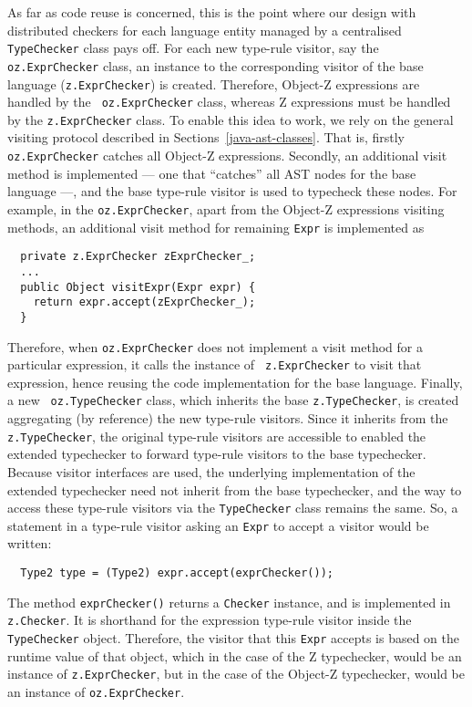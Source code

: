 \documentclass{llncs}
\begin{document}
As far as code reuse is concerned, this is the point where our design
with distributed checkers for each language entity managed by a
centralised {\tt TypeChecker} class pays off.  For each new type-rule
visitor, say the {\tt oz.ExprChecker} class, an instance to the
corresponding visitor of the base language ({\tt z.ExprChecker}) is
created. Therefore, Object-Z expressions are handled by the {\tt
oz.ExprChecker} class, whereas Z expressions must be handled by the
{\tt z.ExprChecker} class.  To enable this idea to work, we rely on
the general visiting protocol described in
Sections~\ref{java-ast-classes}.  That
is, firstly {\tt oz.ExprChecker} catches all Object-Z expressions.
Secondly, an additional visit method is implemented --- one that
``catches'' all AST nodes for the base language ---, and the base
type-rule visitor is used to typecheck these nodes.  For example, in
the {\tt oz.ExprChecker}, apart from the Object-Z expressions
visiting methods, an additional visit method for remaining {\tt Expr}
is implemented as
%
\begin{verbatim}
  private z.ExprChecker zExprChecker_;
  ...
  public Object visitExpr(Expr expr) {
    return expr.accept(zExprChecker_);
  }
\end{verbatim}
%
Therefore, when {\tt oz.ExprChecker} does not implement a visit method
for a particular expression, it calls the instance of {\tt
z.ExprChecker} to visit that expression, hence reusing the code
implementation for the base language.  Finally, a new {\tt
oz.TypeChecker} class, which inherits the base {\tt z.TypeChecker}, is
created aggregating (by reference) the new type-rule visitors.  Since
it inherits from the {\tt z.TypeChecker}, the original type-rule
visitors are accessible to enabled the extended typechecker to forward
type-rule visitors to the base typechecker.  Because visitor
interfaces are used, the underlying implementation of the extended
typechecker need not inherit from the base typechecker, and the way to
access these type-rule visitors via the {\tt TypeChecker} class
remains the same.  So, a statement in a type-rule visitor asking
an {\tt Expr} to accept a visitor would be written:
%
\begin{verbatim}
  Type2 type = (Type2) expr.accept(exprChecker());
\end{verbatim}
%
The method {\tt exprChecker()} returns a {\tt Checker} instance, and
is implemented in {\tt z.Checker}. It is shorthand for the expression
type-rule visitor inside the {\tt TypeChecker} object. Therefore, the
visitor that this {\tt Expr} accepts is based on the runtime value of
that object, which in the case of the Z typechecker, would be an
instance of {\tt z.ExprChecker}, but in the case of the Object-Z
typechecker, would be an instance of {\tt oz.ExprChecker}.
\end{document}
